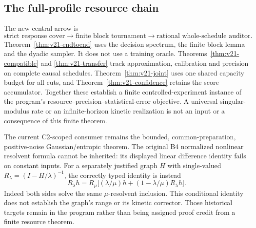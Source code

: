 \subsection{The full-profile resource chain}
The new central arrow is
\[
 \text{strict response cover}
 \longrightarrow\text{finite block tournament}
 \longrightarrow\text{rational whole-schedule auditor}.
\]
Theorem~\ref{thm:v21-endtoend} uses the decision spectrum, the finite
block lemma and the dyadic sampler. It does not use a training oracle.
Theorems~\ref{thm:v21-compatible} and \ref{thm:v21-transfer} track
approximation, calibration and precision on complete causal schedules.
Theorem~\ref{thm:v21-joint} uses one shared capacity budget for all cuts,
and Theorem~\ref{thm:v21-confidence} retains the score accumulator.
Together these establish a finite controlled-experiment instance of the
program's resource--precision--statistical-error objective. A universal
singular-modulus rate or an infinite-horizon kinetic realization is not
an input or a consequence of this finite theorem.

The current C2-scoped consumer remains the bounded, common-preparation,
positive-noise Gaussian/entropic theorem. The original B4 normalized
nonlinear resolvent formula cannot be inherited: its displayed linear
difference identity fails on constant inputs. For a separately justified
graph $H$ with single-valued $R_\lambda=(I-H/\lambda)^{-1}$, the correctly
typed identity is instead
\[
 R_\lambda h=R_\mu\bigl[(\lambda/\mu)h+
                   (1-\lambda/\mu)R_\lambda h\bigr].
\]
Indeed both sides solve the same $\mu$-resolvent inclusion. This
conditional identity does not establish the graph's range or its kinetic
corrector. Those historical targets remain in the program rather than
being assigned proof credit from a finite resource theorem.
\clearpage
